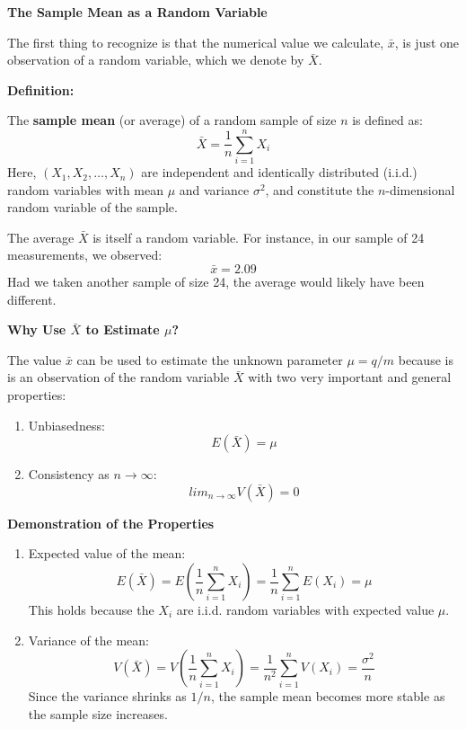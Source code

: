 \documentclass[
]{book}
\begin{document}
\textbf{The Sample Mean as a Random Variable}

The first thing to recognize is that the numerical value we calculate, \(\bar{x}\), is just one observation of a random variable, which we denote by \(\bar{X}\).

\textbf{Definition:}

The \textbf{sample mean} (or average) of a random sample of size \(n\) is defined as:
\[
\bar{X} = \frac{1}{n} \sum_{i=1}^n X_i
\]
Here, \((X_1, X_2, \dots, X_n)\) are independent and identically distributed (i.i.d.) random variables with mean \(\mu\) and variance \(\sigma^2\), and constitute the \(n\)-dimensional random variable of the sample.

The average \(\bar{X}\) is itself a random variable. For instance, in our sample of 24 measurements, we observed:
\[
\bar{x} = 2.09
\]
Had we taken another sample of size 24, the average would likely have been different.

\textbf{Why Use \(\bar{X}\) to Estimate \(\mu\)?}

The value \(\bar{x}\) can be used to estimate the unknown parameter \(\mu = q/m\) because is is an observation of the random variable \(\bar{X}\) with two very important and general properties:

\begin{enumerate}
\def\labelenumi{\arabic{enumi}.}
\item
  Unbiasedness:\\
  \[
  E(\bar{X}) = \mu
  \]
\item
  Consistency as \(n \to \infty\):\\
  \[
  lim_{n \to \infty} V(\bar{X}) = 0
  \]
\end{enumerate}

\textbf{Demonstration of the Properties}

\begin{enumerate}
\def\labelenumi{\arabic{enumi}.}
\item
  Expected value of the mean:
  \[
  E(\bar{X}) = E\left(\frac{1}{n} \sum_{i=1}^n X_i\right) = \frac{1}{n} \sum_{i=1}^n E(X_i) = \mu
  \]
  This holds because the \(X_i\) are i.i.d. random variables with expected value \(\mu\).
\item
  Variance of the mean:
  \[
  V(\bar{X}) = V\left(\frac{1}{n} \sum_{i=1}^n X_i\right) = \frac{1}{n^2} \sum_{i=1}^n V(X_i) = \frac{\sigma^2}{n}
  \]
  Since the variance shrinks as \(1/n\), the sample mean becomes more stable as the sample size increases.
\end{enumerate}
\end{document}

